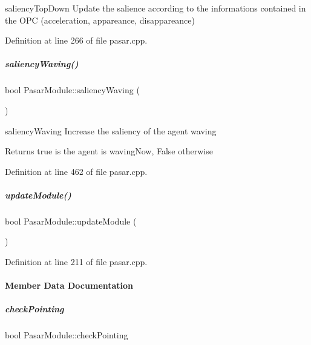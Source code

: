 saliency\+Top\+Down Update the salience according to the informations contained in the O\+PC (acceleration, appareance, disappareance) 



Definition at line 266 of file pasar.\+cpp.

\mbox{\label{group__pasar_a19ed41388e9bfb8f64f3b797212bdedb}} 
\subparagraph{\texorpdfstring{saliency\+Waving()}{saliencyWaving()}}
{\footnotesize\ttfamily bool Pasar\+Module\+::saliency\+Waving (\begin{DoxyParamCaption}{ }\end{DoxyParamCaption})\hspace{0.3cm}{\ttfamily [protected]}}



saliency\+Waving Increase the saliency of the agent waving 

\begin{DoxyReturn}{Returns}
true is the agent is waving\+Now, False otherwise 
\end{DoxyReturn}


Definition at line 462 of file pasar.\+cpp.

\mbox{\label{group__pasar_ae58e47bc057d67d97f4727584f30c0b1}} 
\subparagraph{\texorpdfstring{update\+Module()}{updateModule()}}
{\footnotesize\ttfamily bool Pasar\+Module\+::update\+Module (\begin{DoxyParamCaption}{ }\end{DoxyParamCaption})}



Definition at line 211 of file pasar.\+cpp.



\paragraph{Member Data Documentation}
\mbox{\label{group__pasar_ac1e13b244af26bd77812305485c8c150}} 
\subparagraph{\texorpdfstring{check\+Pointing}{checkPointing}}
{\footnotesize\ttfamily bool Pasar\+Module\+::check\+Pointing\hspace{0.3cm}{\ttfamily [protected]}}



